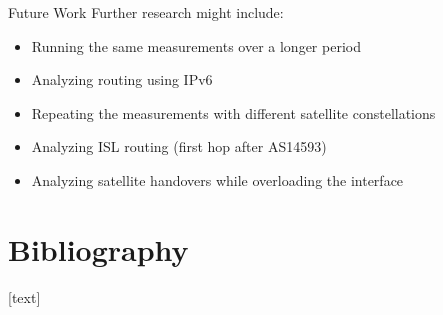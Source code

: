\documentclass[NET,english,beameralt]{tumbeamer}
\begin{document}
\begin{frame}[fragile]{Future Work}
    Further research might include:
    \begin{itemize}
        \item Running the same measurements over a longer period
        \item Analyzing routing using IPv6
        \item Repeating the measurements with different satellite constellations
        \item Analyzing ISL routing (first hop after AS14593)
        \item Analyzing satellite handovers while overloading the interface
    \end{itemize}
\end{frame}

\section{Bibliography}
\begin{frame}[allowframebreaks]
    
    [text]
    \footnotesize
    
\end{frame}
\end{document}
